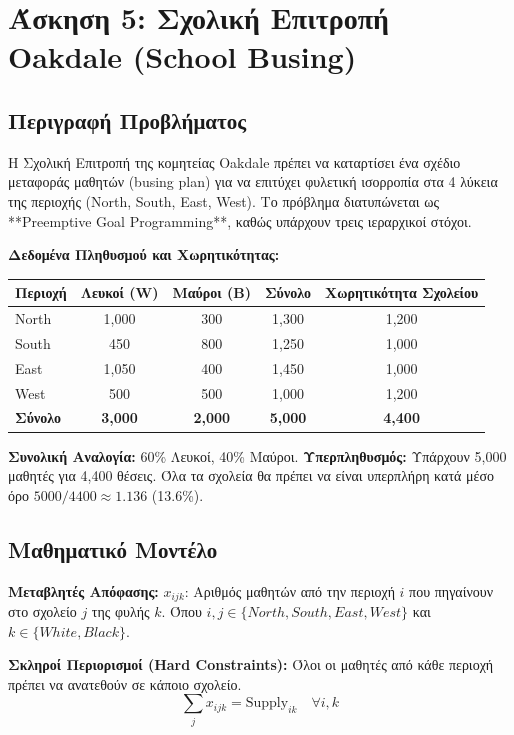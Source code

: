 \documentclass[12pt, a4paper]{article}
\begin{document}
\section*{Άσκηση 5: Σχολική Επιτροπή Oakdale (School Busing)}

\subsection*{Περιγραφή Προβλήματος}
Η Σχολική Επιτροπή της κομητείας Oakdale πρέπει να καταρτίσει ένα σχέδιο μεταφοράς μαθητών (busing plan) για να επιτύχει φυλετική ισορροπία στα 4 λύκεια της περιοχής (North, South, East, West). Το πρόβλημα διατυπώνεται ως **Preemptive Goal Programming**, καθώς υπάρχουν τρεις ιεραρχικοί στόχοι.

\textbf{Δεδομένα Πληθυσμού και Χωρητικότητας:}
\begin{table}[h]
\centering
\begin{tabular}{|l|c|c|c|c|}
\hline
\textbf{Περιοχή} & \textbf{Λευκοί (W)} & \textbf{Μαύροι (B)} & \textbf{Σύνολο} & \textbf{Χωρητικότητα Σχολείου} \\ \hline
North & 1,000 & 300 & 1,300 & 1,200 \\ \hline
South & 450 & 800 & 1,250 & 1,000 \\ \hline
East & 1,050 & 400 & 1,450 & 1,000 \\ \hline
West & 500 & 500 & 1,000 & 1,200 \\ \hline
\textbf{Σύνολο} & \textbf{3,000} & \textbf{2,000} & \textbf{5,000} & \textbf{4,400} \\ \hline
\end{tabular}
\end{table}

\textbf{Συνολική Αναλογία:} 60\% Λευκοί, 40\% Μαύροι.
\textbf{Υπερπληθυσμός:} Υπάρχουν 5,000 μαθητές για 4,400 θέσεις. Όλα τα σχολεία θα πρέπει να είναι υπερπλήρη κατά μέσο όρο $5000/4400 \approx 1.136$ (13.6\%).

\subsection*{Μαθηματικό Μοντέλο}

\textbf{Μεταβλητές Απόφασης:}
$x_{ijk}$: Αριθμός μαθητών από την περιοχή $i$ που πηγαίνουν στο σχολείο $j$ της φυλής $k$.
Όπου $i, j \in \{North, South, East, West\}$ και $k \in \{White, Black\}$.

\textbf{Σκληροί Περιορισμοί (Hard Constraints):}
Όλοι οι μαθητές από κάθε περιοχή πρέπει να ανατεθούν σε κάποιο σχολείο.
$$ \sum_{j} x_{ijk} = \text{Supply}_{ik} \quad \forall i, k $$
\end{document}
